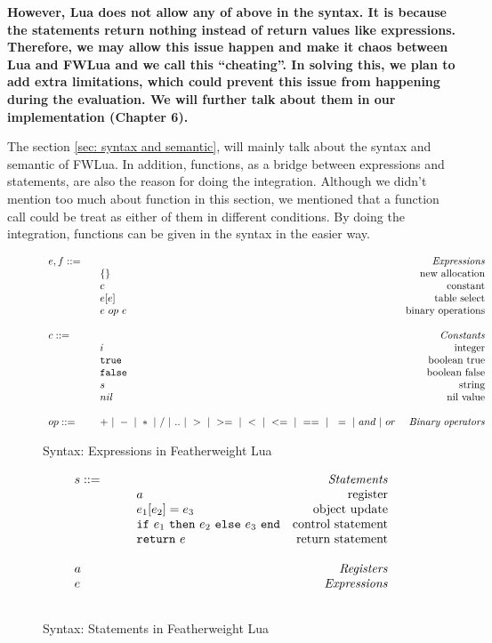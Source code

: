 \documentclass{article}
\newcommand{\rel}[1]{ \mbox{\sc [#1]} }
\begin{document}
{\bf However, Lua does not allow any of above in the syntax. It is because the statements return nothing instead of return values like expressions. Therefore, we may allow this issue happen and make it chaos between Lua and FWLua and we call this ``cheating''. In solving this, we plan to add extra limitations, which could prevent this issue from happening during the evaluation. We will further talk about them in our implementation (Chapter 6).}

The section \ref{sec: syntax and semantic}, will mainly talk about the syntax and semantic of FWLua. In addition, functions, as a bridge between expressions and statements, are also the reason for doing the integration. Although we didn't mention too much about function in this section, we mentioned that a function call could be treat as either of them in different conditions. By doing the integration, functions can be given in the syntax in the easier way.

\begin{figure}
\caption{Syntax: Expressions in Featherweight Lua}
\label{fig:FWLuaExp}
\[
\begin{array}{llr}
  \mydefhead{e,f ::=\qquad\qquad\qquad\qquad}{Expressions}
  \mydefcase{\{\}}{new allocation}
  \mydefcase{c}{constant}
  \mydefcase{e[e]}{table select}
  \mydefcase{e ~op~ e}{binary operations}
  \\
  \mydefhead{c ::=\qquad\qquad\qquad\qquad}{Constants}
  \mydefcase{i}{integer}
  \mydefcase{\tt true}{boolean true}
  \mydefcase{\tt false}{boolean false}
  \mydefcase{s}{string}
  \mydefcase{nil}{nil value}
  \\
  op ::= & + ~|~ - ~|~ * ~|~ / ~|~ .. ~|~ > ~|~ >= ~|~ < ~|~ <= ~|~ == ~|~ ~= ~|~ and ~|~ or & \mbox{\emph{Binary operators}} \\
\end{array}
\]
\end{figure}

\newcommand{\ssrule}[3]{
  \rel{#1} &
  \frac{\strut\begin{array}{@{}c@{}} #2 \end{array}}
       {\strut\begin{array}{@{}c@{}} #3 \end{array}}
   \\~\\
}

\begin{figure}
\caption{Syntax: Statements in Featherweight Lua}
\label{fig:FWLuaStat}
\[
\begin{array}{llr}
  \mydefhead{s ::=\qquad\qquad\qquad\qquad}{Statements}
  \mydefcase{a}{register}
  \mydefcase{e_1[e_2] = e_3}{object update}
  \mydefcase{\ife {e_1} {e_2} {e_3}}{control statement}
  \mydefcase{{\tt return} ~e}{return statement}
  \\
  \mydefhead{a \qquad\qquad\qquad\qquad}{Registers}
  \mydefhead{e \qquad\qquad\qquad\qquad}{Expressions}
  \\
\end{array}
\]
\end{figure}
\end{document}
